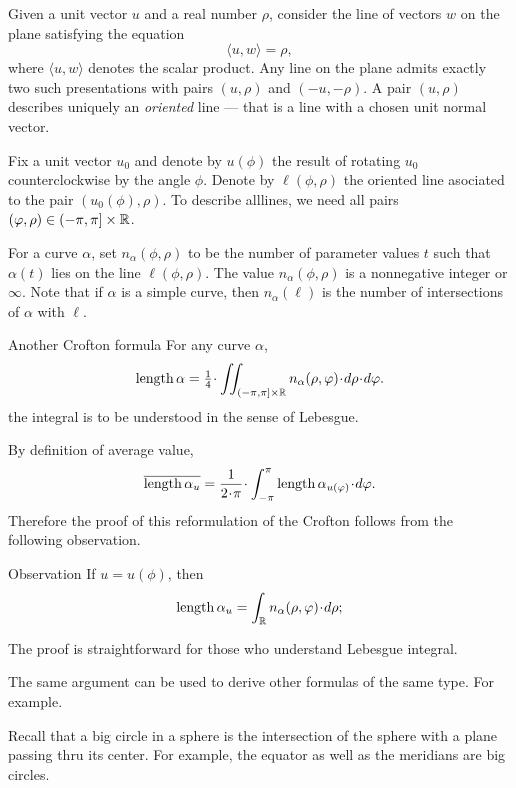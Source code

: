 Given a unit vector $u$ and a real number $\rho$,
consider the line of vectors $w$ on the plane satisfying the equation
\[\langle u, w\rangle =\rho,\]
where $\langle u, w\rangle$ denotes the scalar product. 
Any line on the plane admits exactly two such presentations with pairs $(u,\rho)$ and $(-u,-\rho)$.
A pair $(u,\rho)$ describes uniquely an \emph{oriented} line --- that is a line with a chosen unit normal vector.

Fix a unit vector $u_0$ and denote by $u(\phi)$ the result of rotating $u_0$ counterclockwise by the angle $\phi $. %
Denote by $\ell(\phi,\rho)$ the oriented line asociated to the pair $(u_0 (\phi),\rho)$.
To describe alllines, we need all pairs $(\varphi,\rho)\in (-\pi,\pi]\times \mathbb{R}$.

For a curve $\alpha$, set $n_\alpha(\phi,\rho)$ to be the number of parameter values $t$ such that $\alpha(t)$ lies on the line $\ell(\phi,\rho)$. 
The value $n_\alpha(\phi,\rho)$ is a nonnegative integer or $\infty$.
Note that if $\alpha$ is a simple curve, then $n_\alpha(\ell)$ is the number of intersections of $\alpha$ with $\ell$.


\begin{thm}{Another Crofton formula}
For any curve $\alpha$,
\[\length\alpha=\tfrac14\cdot\iint_{(-\pi,\pi]\times \RR} n_\alpha(\rho,\phi)\cdot d\rho\cdot d\phi.\]
the integral is to be understood in the sense of Lebesgue.
\end{thm}

By definition of average value,
\[\overline{\length\alpha_u}
=
\frac1{2\cdot\pi}\cdot\int_{-\pi}^\pi \length\alpha_{u(\phi)}\cdot d\phi.\]
Therefore the proof of this reformulation of the Crofton follows from the following observation.

\begin{thm}{Observation}
If $u=u(\phi)$, then 
\[\length\alpha_u=\int_\RR n_\alpha(\rho,\phi)\cdot d\rho;\]

\end{thm}

The proof is straightforward for those who understand Lebesgue integral.

The same argument can be used to derive other formulas of the same type.
For example.

Recall that a big circle in a sphere is the intersection of the sphere with a plane passing thru its center.
For example, the equator as well as the meridians are big circles.

